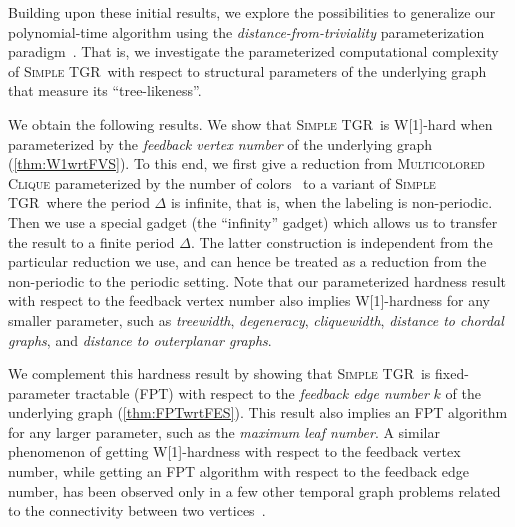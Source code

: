 \documentclass[a4paper,UKenglish,cleveref, autoref, thm-restate]{lipics-v2021}
\newcommand{\deltaExact}{\textsc{Simple TGR}}
\begin{document}
Building upon these initial results, we explore the possibilities to generalize our polynomial-time algorithm using the \emph{distance-from-triviality} parameterization paradigm~\cite{FJR13,GHN04}. That is, we investigate the parameterized computational complexity of \deltaExact\ with respect to structural parameters of the underlying graph that measure its ``tree-likeness''.

We obtain the following results. We show that \deltaExact\ is W[1]-hard when parameterized by the \emph{feedback vertex number} of the underlying graph (\cref{thm:W1wrtFVS}). 
To this end, we first give a reduction from \textsc{Multicolored Clique} parameterized by the number of colors~\cite{fellows2009multipleinterval} to a variant of \deltaExact\ where the period $\Delta$ is infinite, that is, when the labeling is non-periodic. 
Then we use a special gadget (the ``infinity'' gadget) which allows us to transfer the result to a finite period $\Delta$. The latter construction is independent from the particular reduction we use, and can hence be treated as a reduction from the non-periodic to the periodic setting.
Note that our parameterized hardness result with respect to the feedback vertex number 
also implies W[1]-hardness for any smaller parameter, such as \emph{treewidth}, \emph{degeneracy}, \emph{cliquewidth}, 
\emph{distance to chordal graphs}, and \emph{distance to outerplanar graphs}.


We complement this hardness result by showing that \deltaExact\ is fixed-parameter tractable (FPT) with respect to the \emph{feedback edge number} $k$ of the underlying graph (\cref{thm:FPTwrtFES}). 
This result also implies an FPT algorithm for any larger parameter, such as the \emph{maximum leaf number}. 
A similar phenomenon of getting W[1]-hardness with respect to the feedback vertex number, while getting an FPT algorithm with respect to the feedback edge number, has been observed only in a few other temporal graph problems related to the connectivity between two vertices~\cite{casteigts2021finding,FMNR22a,EMM22}.
\end{document}
